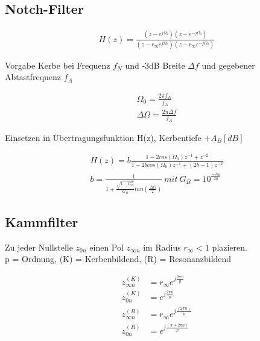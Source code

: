\documentclass[10pt,a4paper]{article}
\begin{document}
\subsection{Notch-Filter}
  \begin{mdframed}[style=exercise]
    \begin{align}
        H(z)=\frac{(z-e^{j\Omega_0})(z-e^{-j\Omega_0})}{(z-r_{\infty}e^{j\Omega_0})(z-r_{\infty}e^{-j\Omega_0})}
    \end{align}
  \end{mdframed}
Vorgabe Kerbe bei Frequenz $f_N$ und -3dB Breite $\Delta f$ und gegebener Abtastfrequenz $f_A$
  \begin{mdframed}[style=exercise]
    \begin{align}
        \Omega_0=\frac{2\pi f_N}{f_A}\\
        \Delta\Omega=\frac{2\pi\Delta f}{f_A}
    \end{align}
  \end{mdframed}
Einsetzen in Übertragungsfunktion H(z), Kerbentiefe $+A_B[dB]$
  \begin{mdframed}[style=exercise]
    \begin{align}
        H(z)=b\frac{1-2cos(\Omega_0)z^{-1}+z^{-2}}{1-2bcos(\Omega_0)z^{-1}+(2b-1)z^{-2}}\\
        b=\frac{1}{1+\frac{\sqrt{1-G_B^2}}{G_B}tan(\frac{\Delta\Omega}{2})} \ mit \ G_B=10^{\frac{-A_B}{20}}
    \end{align}
  \end{mdframed}
\subsection{Kammfilter}
Zu jeder Nullstelle $z_{0n}$ einen Pol $z_{\infty n}$ im Radius $r_\infty<1$ plazieren.\\ 
p = Ordnung, (K) = Kerbenbildend, (R) = Resonanzbildend
  \begin{mdframed}[style=exercise]
    \begin{align}
        z_{\infty n}^{(K)} &= r_\infty e^{j\frac{2\pi n}{p}} \\
        z_{0n}^{(K)} &= e^{j\frac{2\pi n}{p}} \\
        z_{\infty n}^{(R)} &= r_\infty e^{j\frac{(2\pi n)}{p}}\\
        z_{0n}^{(R)} &= e^{j\frac{(\pi + 2\pi n)}{p}} 
    \end{align}
  \end{mdframed}
\end{document}
